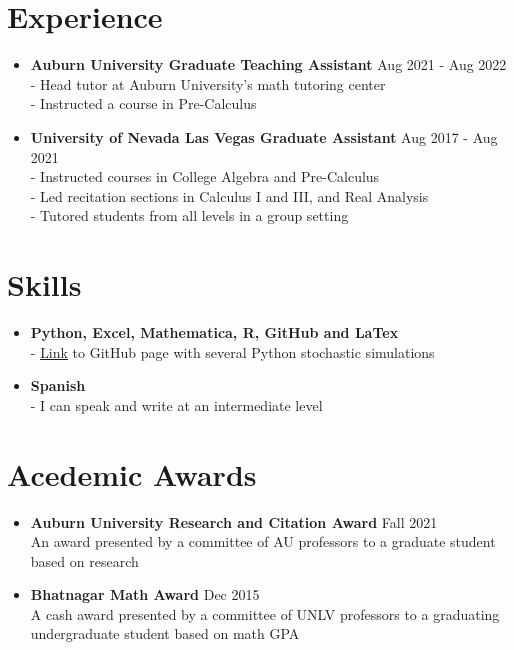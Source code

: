 \documentclass[letterpaper,12pt]{article}
\begin{document}
  
\section{Experience}
\begin{itemize}[itemsep = -2pt, topsep=0pt]
	\item \textbf{Auburn University Graduate Teaching Assistant} {\hfill Aug 2021 - Aug 2022} \\
- Head tutor at Auburn University's math tutoring center \\
- Instructed a course in Pre-Calculus \\
	\item \textbf{University of Nevada Las Vegas Graduate Assistant} {\hfill Aug 2017 - Aug 2021}\\
- Instructed courses in College Algebra and Pre-Calculus \\
- Led recitation sections in Calculus I and III, and Real Analysis \\
- Tutored students from all levels in a group setting \\
\end{itemize}


\section{Skills}
\begin{itemize}[itemsep = -2pt, topsep=0pt]
	\item \textbf{Python, Excel, Mathematica,  R, GitHub and LaTex} \\ 
	- \href{https://github.com/nickeisenberg/Python/tree/master/Stochastic_Simulations}{Link} to GitHub page with several Python stochastic simulations
	\item \textbf{Spanish} \\
		- I can speak and write at an intermediate level
\end{itemize}
  
\section{Acedemic Awards}
\begin{itemize}[itemsep = -2pt, topsep=0pt]
	    \item \noindent \textbf{Auburn University Research and Citation Award} \hfill Fall 2021 \\
	An award presented by a committee of AU professors to a graduate student based on research
	
    \item \noindent \textbf{Bhatnagar Math Award} \hfill Dec 2015 \\
     A cash award presented by a committee of UNLV professors to a graduating undergraduate student based on math GPA    
\end{itemize}
\end{document}
